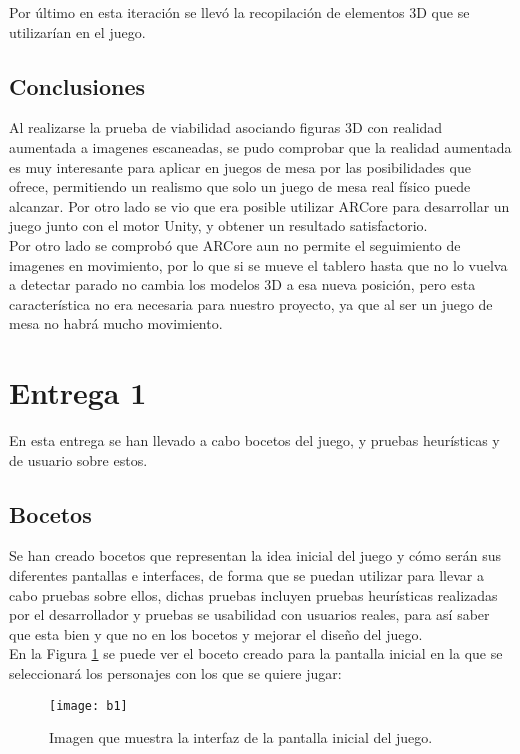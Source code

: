 Por último en esta iteración se llevó la recopilación de elementos 3D que se utilizarían en el juego.

\subsection{Conclusiones}
Al realizarse la prueba de viabilidad asociando figuras 3D con realidad aumentada a imagenes escaneadas, se pudo comprobar que la realidad aumentada es muy interesante para aplicar en juegos de mesa por las posibilidades que ofrece, permitiendo un realismo que solo un juego de mesa real físico puede alcanzar. Por otro lado se vio que era posible utilizar ARCore para desarrollar un juego junto con el motor Unity, y obtener un resultado satisfactorio.\\

Por otro lado se comprobó que ARCore aun no permite el seguimiento de imagenes en movimiento, por lo que si se mueve el tablero hasta que no lo vuelva a detectar parado no cambia los modelos 3D a esa nueva posición, pero esta característica no era necesaria para nuestro proyecto, ya que al ser un juego de mesa no habrá mucho movimiento.

\section{Entrega 1}
En esta entrega se han llevado a cabo bocetos del juego, y pruebas heurísticas y de usuario sobre estos.

\subsection{Bocetos}
Se han creado bocetos que representan la idea inicial del juego y cómo serán sus diferentes pantallas e interfaces, de forma que se puedan utilizar para llevar a cabo pruebas sobre ellos, dichas pruebas incluyen pruebas heurísticas realizadas por el desarrollador y pruebas se usabilidad con usuarios reales, para así saber que esta bien y que no en los bocetos y mejorar el diseño del juego.\\

En la Figura \ref{figura-b1} se puede ver el boceto creado para la pantalla inicial en la que se seleccionará los personajes con los que se quiere jugar:

\begin{figure}[h]
  \centering
  \texttt{[image: b1]}
  \caption{Imagen que muestra la interfaz de la pantalla inicial del juego.\protect\footnotemark}
  \label{figura-b1}
\end{figure}

